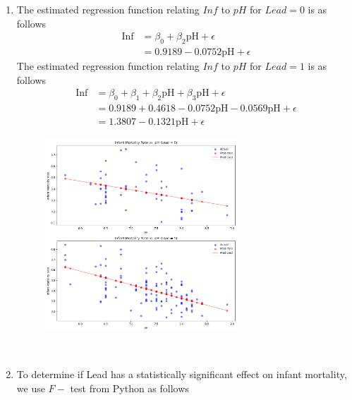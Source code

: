 \documentclass{uofa-eng-assignment}
\begin{document}
\begin{enumerate}
\begin{enumerate}
\begin{enumerate}
                    \item The estimated regression function relating $Inf$ to $pH$ for $Lead = 0$ is as
                          follows
                          \begin{align*}
                              \text{Inf} & = \beta_0 + \beta_2\text{pH} + \epsilon \\
                                         & = 0.9189 - 0.0752\text{pH} + \epsilon
                          \end{align*}
                          The estimated regression function relating $Inf$ to $pH$ for $Lead = 1$ is as follows
                          \begin{align*}
                              \text{Inf} & = \beta_0 + \beta_1 + \beta_2\text{pH} + \beta_3\text{pH} + \epsilon \\
                                         & = 0.9189 + 0.4618 - 0.0752\text{pH} - 0.0569\text{pH} + \epsilon     \\
                                         & = 1.3807 - 0.1321\text{pH} + \epsilon
                          \end{align*}
                          \begin{figure}[h]
                              \centering
                              \includegraphics[width=0.68\textwidth]{p1-b-ii.png}
                          \end{figure} \\
                    \item To determine if Lead has a statistically significant effect on infant
                          mortality, we use $F-$ test from Python as follows

\end{enumerate}
\end{enumerate}
\end{enumerate}
\end{document}
